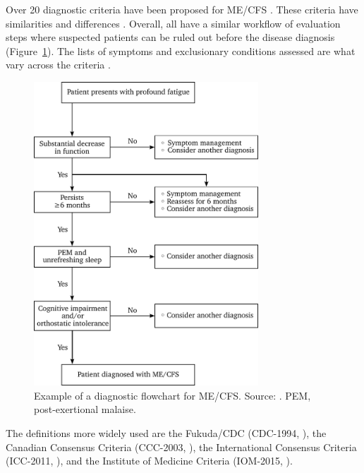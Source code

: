 Over 20 diagnostic criteria have been proposed for ME/CFS \citep{bayliss2014OvercomingBarriers, brurberg2014CaseDefinitions}.
These criteria have similarities and differences \citep{lim2020ReviewCase, malato2021Statisticalchallenges}.
Overall, all have a similar workflow of evaluation steps where suspected patients can be ruled out before the disease diagnosis (Figure~\ref{fig:intro-flowchart}).
The lists of symptoms and exclusionary conditions assessed are what vary across the criteria \citep{lim2020ReviewCase}.

\begin{figure}[htbp]
    \centering
    \includegraphics[width=0.75\textwidth]{chapter/introduction/figures/iom-diagnosis-tikz.pdf}
    \caption[Example of a diagnostic flowchart for ME/CFS]{Example of a diagnostic flowchart for ME/CFS. Source: \citet[chap.~7]{instituteofmedicine2015MyalgicEncephalomyelitis}. PEM, post-exertional malaise.}
    \label{fig:intro-flowchart}
\end{figure}

The definitions more widely used are the Fukuda/CDC (CDC-1994, \citealt{fukuda1994ChronicFatigue}), the Canadian Consensus Criteria (CCC-2003, \citealt{carruthers2003MyalgicEncephalomyelitis}), the International Consensus Criteria (ICC-2011, \citealt{carruthers2011MyalgicEncephalomyelitis}), and the Institute of Medicine Criteria (IOM-2015, \citealt{instituteofmedicine2015MyalgicEncephalomyelitis}).

